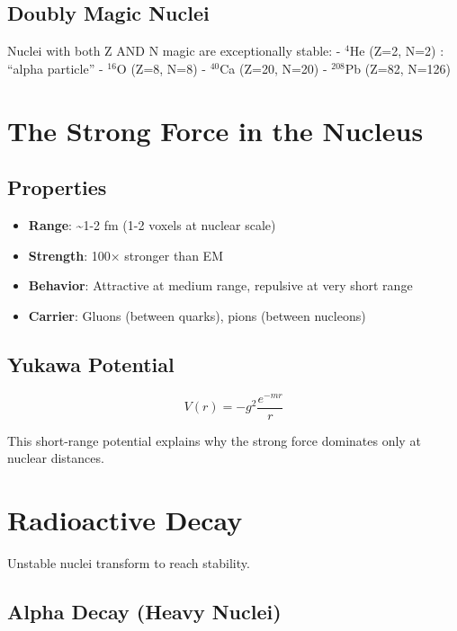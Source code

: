 \documentclass[
  11pt,
  letterpaper,
  twoside,
  openright]{book}
\providecommand{\tightlist}{%
  \setlength{\itemsep}{0pt}\setlength{\parskip}{0pt}}
\begin{document}
\subsection{Doubly Magic Nuclei}\label{doubly-magic-nuclei}

Nuclei with both Z AND N magic are exceptionally stable: - \(^4\)He
(Z=2, N=2) : ``alpha particle'' - \(^{16}\)O (Z=8, N=8) - \(^{40}\)Ca
(Z=20, N=20) - \(^{208}\)Pb (Z=82, N=126)

\section{The Strong Force in the
Nucleus}\label{the-strong-force-in-the-nucleus}

\subsection{Properties}\label{properties}

\begin{itemize}
\tightlist
\item
  \textbf{Range}: \textasciitilde1-2 fm (1-2 voxels at nuclear scale)
\item
  \textbf{Strength}: 100× stronger than EM
\item
  \textbf{Behavior}: Attractive at medium range, repulsive at very short
  range
\item
  \textbf{Carrier}: Gluons (between quarks), pions (between nucleons)
\end{itemize}

\subsection{Yukawa Potential}\label{yukawa-potential}

\[
V(r) = -g^2 \frac{e^{-mr}}{r}
\]

This short-range potential explains why the strong force dominates only
at nuclear distances.

\section{Radioactive Decay}\label{radioactive-decay}

Unstable nuclei transform to reach stability.

\subsection{Alpha Decay (Heavy Nuclei)}\label{alpha-decay-heavy-nuclei}
\end{document}
